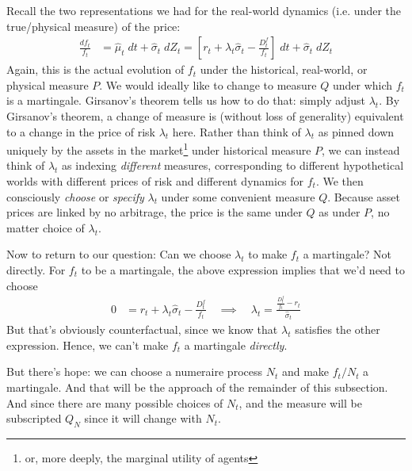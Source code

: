 \documentclass[12pt]{article}
\theoremstyle{plain}
\theoremstyle{definition}
\theoremstyle{remark}
\begin{document}
Recall the two representations we had for the real-world dynamics (i.e.
under the true/physical measure) of the price:
\begin{align*}
  \frac{df_{t}}{f_t}
  &=
  \hat{\mu}_t
  \; dt
  +
  \hat{\sigma}_t
  \;dZ_t
  =
  \left[
  r_t+\lambda_t\hat{\sigma}_{t}
  -\frac{D_{t}^f}{f_{t}}
  \right]
  \; dt
  +
  \hat{\sigma}_t
  \;dZ_t
\end{align*}
Again, this is the actual evolution of $f_t$ under the historical,
real-world, or physical measure $P$. We would ideally like to change to
measure $Q$ under which $f_t$ is a martingale.
Girsanov's theorem tells us how to do that: simply adjust $\lambda_t$.
By Girsanov's theorem, a change of measure is (without loss of
generality) equivalent to a change in the price of risk $\lambda_t$
here.
Rather than think of $\lambda_t$ as pinned down uniquely by the assets
in the market\footnote{%
  or, more deeply, the marginal utility of agents
}
under historical measure $P$, we can instead think of $\lambda_t$ as
indexing \emph{different} measures, corresponding to different
hypothetical worlds with different prices of risk and different dynamics
for $f_t$.
We then consciously \emph{choose} or \emph{specify} $\lambda_t$ under
some convenient measure $Q$.
Because asset prices are linked by no arbitrage, the price is the
same under $Q$ as under $P$, no matter choice of $\lambda_t$.

Now to return to our question: Can we choose $\lambda_t$ to make $f_t$ a
martingale?
Not directly. For $f_t$ to be a martingale, the above expression implies
that we'd need to choose
\begin{align*}
  0
  &=
  r_t+\lambda_t\hat{\sigma}_{t}
  -\frac{D_{t}^f}{f_{t}}
  \quad\implies\quad
  \lambda_t
  =
  \frac{\frac{D_{t}^f}{f_{t}} - r_t}{\hat{\sigma}_{t}}
\end{align*}
But that's obviously counterfactual, since we know that $\lambda_t$
satisfies the other expression. Hence, we can't make $f_t$ a martingale
\emph{directly}.

But there's hope: we can choose a numeraire process $N_t$ and make
$f_t/N_t$ a martingale. And that will be the approach of the remainder
of this subsection. And since there are many possible choices of $N_t$,
and the measure will be subscripted $Q_N$ since it will change with
$N_t$.
\end{document}
